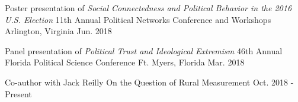 

\begin{cventries}



\cventry
  {Poster presentation of \emph{Social Connectedness and Political Behavior in the 2016 U.S. Election}} %
  {11th Annual Political Networks Conference and Workshops} %
  {Arlington, Virginia} %
  {Jun. 2018} %
  {}


\cventry
  {Panel presentation of \emph{Political Trust and Ideological Extremism}} %
  {46th Annual Florida Political Science Conference} %
  {Ft. Myers, Florida} %
  {Mar. 2018} %
  {}

\cventry
  {Co-author with Jack Reilly} %
  {On the Question of Rural Measurement} %
  {Oct. 2018 - Present} %
  {} %
  {}


\end{cventries}
